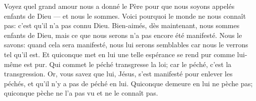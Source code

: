 Voyez quel grand amour nous a donné le Père
	pour que nous soyons appelés enfants de Dieu
	--- et nous le sommes.
Voici pourquoi le monde ne nous connaît pas:
	c’est qu’il n’a pas connu Dieu.
Bien-aimés, dès maintenant, nous sommes enfants de Dieu,
	mais ce que nous serons n’a pas encore été manifesté.
Nous le savons: quand cela sera manifesté, nous lui serons semblables
	car nous le verrons tel qu’il est.
Et quiconque met en lui une telle espérance
	se rend pur comme lui-même est pur.
Qui commet le péché transgresse la loi;
	car le péché, c’est la transgression.
Or, vous savez que lui, Jésus, s’est manifesté pour enlever les péchés,
	et qu’il n’y a pas de péché en lui.
Quiconque demeure en lui ne pèche pas;
	quiconque pèche ne l’a pas vu et ne le connaît pas.

